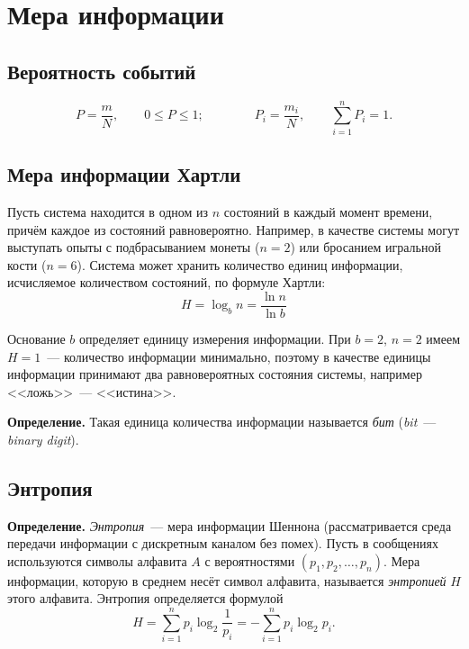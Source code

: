 \documentclass[a4paper,11pt]{article}
\begin{document}
\section{Мера информации}

\subsection{Вероятность событий}

\[
  P = \frac{m}{N}, \qquad 0 \le P \le 1; \qquad\qquad
  P_i = \frac{m_i}{N}, \qquad \sum_{i=1}^{n} P_i = 1.
\]

\subsection{Мера информации Хартли}

Пусть система находится в одном из $n$ состояний в каждый момент времени, причём каждое из
состояний равновероятно. Например, в качестве системы могут выступать опыты с подбрасыванием
монеты ($n = 2$) или бросанием игральной кости ($n = 6$). Система может хранить количество единиц
информации, исчисляемое количеством состояний, по формуле Хартли:
\[
  \boxed{H = \log_b n = \frac{\ln n}{\ln b}}
\]

Основание $b$ определяет единицу измерения информации. При $b = 2$, $n = 2$ имеем $H = 1$~---
количество информации минимально, поэтому в качестве единицы информации принимают два
равновероятных состояния системы, например <<ложь>>~--- <<истина>>.

\begin{opr}
\textbf{Определение.} Такая единица количества информации называется \emph{бит}
(\emph{bit}~--- \emph{binary digit}).
\end{opr}

\subsection{Энтропия}

\begin{opr}
\textbf{Определение.} \emph{Энтропия}~--- мера информации Шеннона (рассматривается среда передачи
информации с дискретным каналом без помех). Пусть в сообщениях используются символы алфавита $A$
с вероятностями $(p_1, p_2, \dots, p_n)$. Мера информации, которую в среднем несёт символ алфавита,
называется \emph{энтропией} $H$ этого алфавита. Энтропия определяется формулой
\[
  H = \sum_{i=1}^{n} p_i \log_2 \frac{1}{p_i} = -\sum_{i=1}^{n} p_i \log_2 p_i.
\]
\end{opr}
\end{document}
